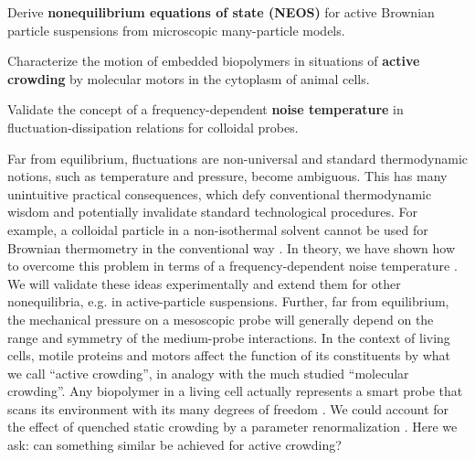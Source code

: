 \begin{workpackage}[id=WPactive,wphases=0-48,
  short=Active Particle Suspensions,%
  title=Probing active particle suspensions with colloids and polymers,
  lead=ULEI,
  ULEIRM=96,UNIPDRM=6,USTUTTRM=2]

\newrefsection

\begin{mdframed}
\mobjectives
%
  \begin{compactitem}
  \item Derive \textbf{nonequilibrium equations of state (NEOS)} for active Brownian
  particle suspensions from microscopic many-particle models.
  \item Characterize the motion of embedded biopolymers in situations of \textbf{active
    crowding} by molecular motors in the cytoplasm of animal cells.
  \item Validate the concept of a frequency-dependent \textbf{noise temperature} in
  fluctuation-dissipation relations for colloidal probes.
  \end{compactitem}

\mdescription
%
Far from equilibrium, fluctuations are non-universal and standard thermodynamic notions,
such as temperature and pressure, become ambiguous.
This has many unintuitive practical consequences, which defy conventional thermodynamic
wisdom and potentially invalidate standard technological procedures.
%
For example, a colloidal particle in a non-isothermal solvent cannot be used for Brownian thermometry 
in the conventional way \cite{rings-etal:2010,kroy:2014}. In theory, we have shown how to overcome this problem
in terms of a frequency-dependent noise temperature \cite{falasco-etal:2014}.
%
We will validate these ideas experimentally and extend them for other
nonequilibria, e.g. in active-particle suspensions.
%
Further, far from equilibrium, the mechanical pressure on a mesoscopic probe will generally depend on the range and 
symmetry of the medium-probe interactions. 
%
In the context of living cells, motile proteins and motors affect the function
of its constituents by what  we call ``active crowding'', in analogy with the much studied ``molecular crowding''. 
%
Any biopolymer in a living cell actually represents a smart probe that scans its environment with its many 
degrees of freedom \cite{otto-etal:2013}.
%
We could account for the effect of quenched static crowding by a parameter renormalization \cite{schoebl-etal:2014}.  
%
Here we ask: can something similar be achieved for active crowding?
\end{mdframed}


\end{workpackage}

